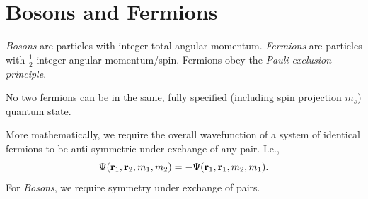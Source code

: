 \documentclass{book}
\begin{document}
\section{Bosons and Fermions}
\textit{Bosons} are particles with integer total angular momentum. \textit{Fermions} are particles with $\frac{1}{2}$-integer angular momentum/spin. Fermions obey the \textit{Pauli exclusion principle}.
\begin{tcolorbox}[colback=blue!5!white,colframe=blue!75!black,width=\textwidth,fonttitle=\bfseries, title={Pauli Exclusion Principle}]
	No two fermions can be in the same, fully specified (including spin projection $m_s$) quantum state.
\end{tcolorbox}
More mathematically, we require the overall wavefunction of a system of identical fermions to be anti-symmetric under exchange of any pair. I.e.,
\begin{equation}
	\Psi(\vb{r}_1,\vb{r}_2,m_1,m_2) = - \Psi(\vb{r}_1,\vb{r}_1, m_2, m_1).
\end{equation}
For \textit{Bosons}, we require symmetry under exchange of pairs.
\end{document}

